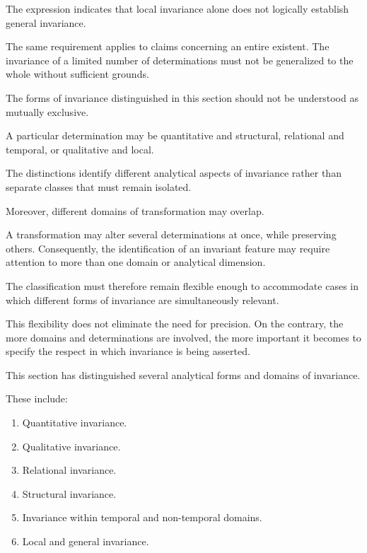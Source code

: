 The expression indicates that
local invariance alone does not
logically establish general
invariance.

The same requirement applies
to claims concerning an entire
existent. The invariance of
a limited number of determinations
must not be generalized to
the whole without sufficient
grounds.


The forms of invariance distinguished
in this section should not be
understood as mutually exclusive.

A particular determination may
be quantitative and structural,
relational and temporal, or
qualitative and local.

The distinctions identify
different analytical aspects
of invariance rather than
separate classes that must
remain isolated.

Moreover, different domains
of transformation may overlap.

A transformation may alter
several determinations at once,
while preserving others.
Consequently, the identification
of an invariant feature may
require attention to more
than one domain or analytical
dimension.

The classification must therefore
remain flexible enough to
accommodate cases in which
different forms of invariance
are simultaneously relevant.

This flexibility does not
eliminate the need for precision.
On the contrary, the more
domains and determinations
are involved, the more important
it becomes to specify the
respect in which invariance
is being asserted.


This section has distinguished
several analytical forms and
domains of invariance.

These include:

\begin{enumerate}
    \item Quantitative invariance.
    \item Qualitative invariance.
    \item Relational invariance.
    \item Structural invariance.
    \item Invariance within temporal
    and non-temporal domains.
    \item Local and general invariance.
\end{enumerate}

